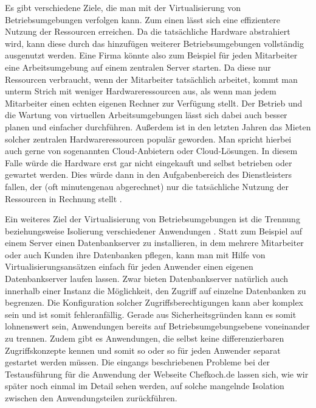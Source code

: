 Es gibt verschiedene Ziele, die man mit der Virtualisierung von Betriebsumgebungen verfolgen kann. Zum einen lässt sich eine effizientere Nutzung der Ressourcen erreichen. Da die tatsächliche Hardware abstrahiert wird, kann diese durch das hinzufügen weiterer Betriebsumgebungen vollständig ausgenutzt werden. Eine Firma könnte also zum Beispiel für jeden Mitarbeiter eine Arbeitsumgebung auf einem zentralen Server starten. Da diese nur Ressourcen verbraucht, wenn der Mitarbeiter tatsächlich arbeitet, kommt man unterm Strich mit weniger Hardwareressourcen aus, als wenn man jedem Mitarbeiter einen echten eigenen Rechner zur Verfügung stellt. Der Betrieb und die Wartung von virtuellen Arbeitsumgebungen lässt sich dabei auch besser planen und einfacher durchführen. Außerdem ist in den letzten Jahren das Mieten solcher zentralen Hardwareressourcen populär geworden. Man spricht hierbei auch gerne von sogenannten Cloud-Anbietern oder Cloud-Lösungen. In diesem Falle würde die Hardware erst gar nicht eingekauft und selbst betrieben oder gewartet werden. Dies würde dann in den Aufgabenbereich des Dienstleisters fallen, der (oft minutengenau abgerechnet) nur die tatsächliche Nutzung der Ressourcen in Rechnung stellt \citep[Vgl.][S. 7]{ZhaChe14}.

Ein weiteres Ziel der Virtualisierung von Betriebsumgebungen ist die Trennung beziehungsweise Isolierung verschiedener Anwendungen \citep[Vgl.][Abstract]{Schee14}. Statt zum Beispiel auf einem Server einen Datenbankserver zu installieren, in dem mehrere Mitarbeiter oder auch Kunden ihre Datenbanken pflegen, kann man mit Hilfe von Virtualisierungsansätzen einfach für jeden Anwender einen eigenen Datenbankserver laufen lassen. Zwar bieten Datenbankserver natürlich auch innerhalb einer Instanz die Möglichkeit, den Zugriff auf einzelne Datenbanken zu begrenzen. Die Konfiguration solcher Zugriffsberechtigungen kann aber komplex sein und ist somit fehleranfällig. Gerade aus Sicherheitsgründen kann es somit lohnenswert sein, Anwendungen bereits auf Betriebsumgebungsebene voneinander zu trennen. Zudem gibt es Anwendungen, die selbst keine differenzierbaren Zugriffskonzepte kennen und somit so oder so für jeden Anwender separat gestartet werden müssen. Die eingangs beschriebenen Probleme bei der Testausführung für die Anwendung der Webseite Chefkoch.de lassen sich, wie wir später noch einmal im Detail sehen werden, auf solche mangelnde Isolation zwischen den Anwendungsteilen zurückführen.

